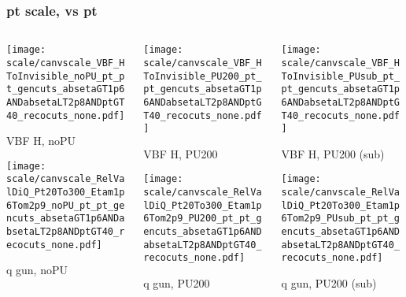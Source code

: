 \documentclass[8pt]{beamer}
\begin{document}
 \begin{frame}
  \frametitle{pt scale, vs pt}
  
  \begin{columns}
   \begin{column}{0.35\textwidth}
     \texttt{[image: scale/canvscale\_VBF\_HToInvisible\_noPU\_pt\_pt\_gencuts\_absetaGT1p6ANDabsetaLT2p8ANDptGT40\_recocuts\_none.pdf]}
     
     VBF H, noPU
    
     \texttt{[image: scale/canvscale\_RelValDiQ\_Pt20To300\_Etam1p6Tom2p9\_noPU\_pt\_pt\_gencuts\_absetaGT1p6ANDabsetaLT2p8ANDptGT40\_recocuts\_none.pdf]}
     
     q gun, noPU
   \end{column}
   \begin{column}{0.35\textwidth}
     \texttt{[image: scale/canvscale\_VBF\_HToInvisible\_PU200\_pt\_pt\_gencuts\_absetaGT1p6ANDabsetaLT2p8ANDptGT40\_recocuts\_none.pdf]}
     
     VBF H, PU200
    
     \texttt{[image: scale/canvscale\_RelValDiQ\_Pt20To300\_Etam1p6Tom2p9\_PU200\_pt\_pt\_gencuts\_absetaGT1p6ANDabsetaLT2p8ANDptGT40\_recocuts\_none.pdf]}
     
     q gun, PU200
   \end{column}
   \begin{column}{0.35\textwidth}
     \texttt{[image: scale/canvscale\_VBF\_HToInvisible\_PUsub\_pt\_pt\_gencuts\_absetaGT1p6ANDabsetaLT2p8ANDptGT40\_recocuts\_none.pdf]}
     
     VBF H, PU200 (sub)
    
     \texttt{[image: scale/canvscale\_RelValDiQ\_Pt20To300\_Etam1p6Tom2p9\_PUsub\_pt\_pt\_gencuts\_absetaGT1p6ANDabsetaLT2p8ANDptGT40\_recocuts\_none.pdf]}
     
     q gun, PU200 (sub)
   \end{column}
  \end{columns}
 \end{frame}
 
\end{document}
